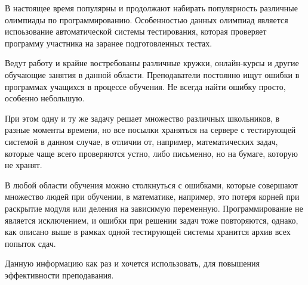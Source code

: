 \documentclass[specification,annotation]{itmo-student-thesis}
\begin{document}


\researchfunding{}

\researchpublications{
}



\tableofcontents

\startprefacepage

В настоящее время популярны и продолжают набирать популярность различные олимпиады по программированию.
Особенностью данных олимпиад является испоьзование автоматической системы тестирования, которая проверяет
программу участника на заранее подготовленных тестах.

Ведут работу и крайне востребованы различные кружки, онлайн-курсы и другие обучающие занятия в данной области.
Преподаватели постоянно ищут ошибки в программах учащихся в процессе обучения. Не всегда найти ошибку просто, 
особенно небольшую. 

При этом одну и ту же задачу решает множество различных школьников, в разные моменты времени, но все посылки
храняться на сервере с тестирующей системой в данном случае, в отличии от, например, математических задач,
которые чаще всего проверяются устно, либо письменно, но на бумаге, которую не хранят.

В любой области обучения можно столкнуться с ошибками, которые совершают множество людей при обучении,
в математике, например, это потеря корней при раскрытие модуля или деления на зависимую переменную.
Программирование не является исключением, и ошибки при решении задач тоже повторяются, однако, как описано выше
в рамках одной тестирующей системы хранится архив всех попыток сдач. 

Данную информацию как раз и хочется использовать, для повышения эффективности преподавания.




\printmainbibliography
\end{document}
